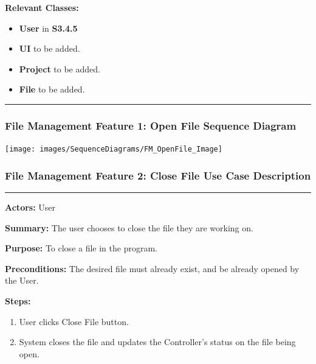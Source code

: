 \documentclass[twoside,letterpaper]{article}
\begin{document}
\noindent\textbf{Relevant Classes:}
\begin{itemize}
	\item \textbf{User} in \textbf{S3.4.5}
	\item \textbf{UI} to be added.
	\item \textbf{Project} to be added.
	\item \textbf{File} to be added.
\end{itemize}

\hrule

\newpage

\subsubsection[File Management Feature 1: Open File Sequence Diagram]{\rmfamily\bfseries\color{black}
	File Management Feature 1: Open File Sequence Diagram}
\hypertarget{RefHeading22059017292}{}

\texttt{[image: images/SequenceDiagrams/FM\_OpenFile\_Image]}

\newpage

\subsubsection[File Management Feature 2: Close File Use Case Description]{\rmfamily\bfseries\color{black}
	File Management Feature 2: Close File Use Case Description}
\hypertarget{RefHeading22059017292}{}

\vspace{2pt}
\hrule
\vspace{8pt}
\textbf{Actors:} User \newline

\noindent\textbf{Summary:} The user chooses to close the file they are working on. \newline

\noindent\textbf{Purpose:} To close a file in the program. \newline

\noindent\textbf{Preconditions:} The desired file must already exist, and be already opened by the User. \newline

\noindent\textbf{Steps:}
\begin{enumerate}
	\item User clicks Close File button.
	\item System closes the file and updates the Controller's status on the file being open.
\end{enumerate}
\end{document}
